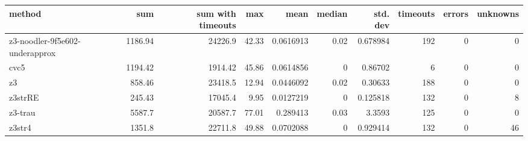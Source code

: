 \begin{tabular}{lrrrrrrrrr}
\hline
 method                         &     sum &   sum with timeouts &   max &      mean &   median &   std. dev &   timeouts &   errors &   unknowns \\
\hline
 z3-noodler-9f5e602-underapprox & 1186.94 &            24226.9  & 42.33 & 0.0616913 &     0.02 &   0.678984 &        192 &        0 &          0 \\
 cvc5                           & 1194.42 &             1914.42 & 45.86 & 0.0614856 &     0    &   0.86702  &          6 &        0 &          0 \\
 z3                             &  858.46 &            23418.5  & 12.94 & 0.0446092 &     0.02 &   0.30633  &        188 &        0 &          0 \\
 z3strRE                        &  245.43 &            17045.4  &  9.95 & 0.0127219 &     0    &   0.125818 &        132 &        0 &          8 \\
 z3-trau                        & 5587.7  &            20587.7  & 77.01 & 0.289413  &     0.03 &   3.3593   &        125 &        0 &          0 \\
 z3str4                         & 1351.8  &            22711.8  & 49.88 & 0.0702088 &     0    &   0.929414 &        132 &        0 &         46 \\
\hline
\end{tabular}

